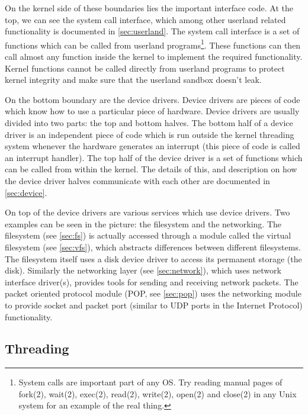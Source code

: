 \documentclass[twoside,a4paper]{report}
\begin{document}
On the kernel side of these boundaries lies the important interface
code.  At the top, we can see the system call interface, which among
other userland related functionality is documented in
\autoref{sec:userland}. The system call interface is a set of
functions which can be called from userland programs\footnote{System
calls are important part of any OS. Try reading manual pages of
fork(2), wait(2), exec(2), read(2), write(2), open(2) and close(2) in
any Unix system for an example of the real thing.}. These functions
can then call almost any function inside the kernel to implement the
required functionality. Kernel functions cannot be called directly
from userland programs to protect kernel integrity and make sure that
the userland sandbox doesn't leak.

On the bottom boundary are the device drivers. Device drivers are
pieces of code which know how to use a particular piece of hardware.
Device drivers are usually divided into two parts: the top and bottom
halves. The bottom half of a device driver is an independent piece of
code which is run outside the kernel threading system whenever the
hardware generates an interrupt (this piece of code is called an
interrupt handler). The top
half of the device driver is a set of functions which can be called
from within the kernel. The details of this, and description on how
the device driver halves communicate with each other are documented in
\autoref{sec:device}.

On top of the device drivers are various services which use device
drivers. Two examples can be seen in the picture: the filesystem and
the networking. The filesystem (see \autoref{sec:fs}) is actually
accessed through a module called the virtual filesystem (see
\autoref{sec:vfs}), which abstracts differences between different
filesystems. The filesystem itself uses a disk device driver to access
its permanent storage (the disk). Similarly the networking layer (see
\autoref{sec:network}), which uses network interface driver(s),
provides tools for sending and receiving network packets. The packet
oriented protocol module (POP, see \autoref{sec:pop}) uses the
networking module to provide socket and packet port (similar to UDP
ports in the Internet Protocol) functionality.

\subsection{Threading}

\end{document}
